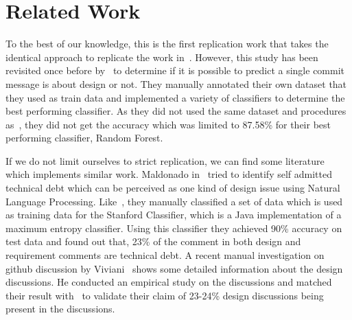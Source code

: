 \section{Related Work}
\label{sect:related_work}
To the best of our knowledge, this is the first replication work that takes the identical approach to replicate the work in~\cite{Brunet2014a}. However, this study has been revisited once before by~\cite{Shakiba2016} to determine if it is possible to predict a single commit message is about design or not. They manually annotated their own dataset that they used as train data and implemented a variety of classifiers to determine the best performing classifier. As they did not used the same dataset and procedures as~\cite{Brunet2014a}, they did not get the accuracy which was limited to 87.58\% for their best performing classifier, Random Forest.

If we do not limit ourselves to strict replication, we can find some literature which implements similar work. Maldonado in~\cite{Maldonado2017} tried to identify self admitted technical debt which can be perceived as one kind of design issue using Natural Language Processing. Like~\cite{Brunet2014a}, they manually classified a set of data which is used as training data for the Stanford Classifier, which is a Java implementation of a maximum entropy classifier. Using this classifier they achieved 90\% accuracy on test data and found out that, 23\% of the comment in both design and requirement comments are technical debt. A recent manual investigation on github discussion by Viviani~\cite{Viviani2018} shows some detailed information about the design discussions. He conducted an empirical study on the discussions and matched their result with~\cite{Brunet2014a} to validate their claim of 23-24\% design discussions being present in the discussions.   
